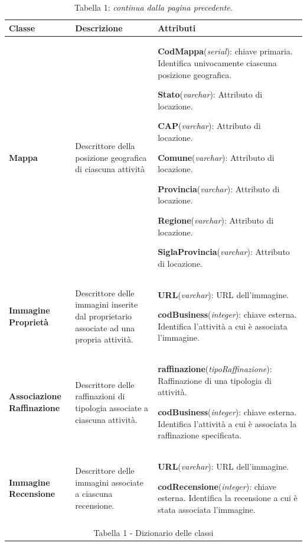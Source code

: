 \documentclass[a4paper,12pt]{article}
\begin{document}
\newpage\null{}\setcounter{page}{8}
\vspace{-2cm}
\begin{table}[htbp]
\caption*{Tabella 1: {\it continua dalla pagina precedente.}}
\begin{tabular}[c]{| m{3cm} | m{5cm} | m{7cm} |}
\hline
\bf Classe&\bf Descrizione&\bf Attributi\\
\hline
{\bf Mappa}
&\small Descrittore della posizione geografica di ciascuna attività
&\footnotesize

{\bf CodMappa}({\it serial}): chiave primaria. Identifica univocamente ciascuna posizione geografica.

{\bf Stato}({\it varchar}): Attributo di locazione.

{\bf CAP}({\it varchar}): Attributo di locazione.

{\bf Comune}({\it varchar}): Attributo di locazione.

{\bf Provincia}({\it varchar}): Attributo di locazione.

{\bf Regione}({\it varchar}): Attributo di locazione.

{\bf SiglaProvincia}({\it varchar}): Attributo di locazione.
\\
\hline

{\bf Immagine
Proprietà}
&\small Descrittore delle immagini inserite dal proprietario associate ad una propria
attività.
&\footnotesize
{\bf URL}({\it varchar}): URL dell'immagine.

{\bf codBusiness}({\it integer}): chiave esterna. Identifica l'attività a
cui è associata l'immagine.
\\
\hline

{\bf Associazione
Raffinazione}
&\small Descrittore delle raffinazioni di tipologia associate a ciascuna attività.
&\footnotesize
{\bf raffinazione}({\it tipoRaffinazione}): Raffinazione di una tipologia di attività.

{\bf codBusiness}({\it integer}): chiave esterna. Identifica l'attività a
cui è associata la raffinazione specificata.
\\
\hline

{\bf Immagine
Recensione}
&\small Descrittore delle immagini associate a ciascuna recensione.
&\footnotesize
{\bf URL}({\it varchar}): URL dell'immagine.

{\bf codRecensione}({\it integer}): chiave esterna. Identifica la recensione a 
cui è stata associata l'immagine.
\\
\hline
\multicolumn{3}{c}{\footnotesize{\normalsize Tabella 1 - Dizionario delle classi}}
\end{tabular}
\end{table}
\newpage
\end{document}

